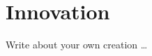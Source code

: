 \chapter{Innovation}\label{ch:innovation}
    Write about your own creation \dots

    \lipsum[1-3]
